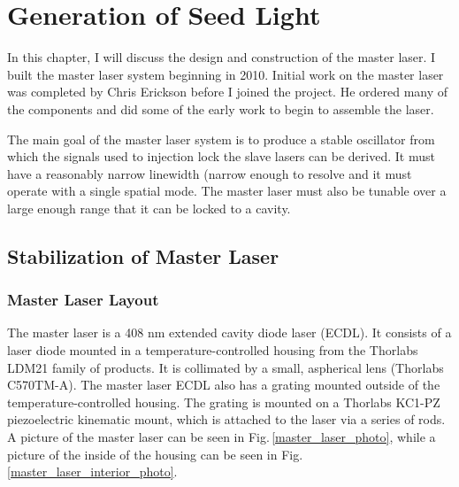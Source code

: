 \chapter{Generation of Seed Light}\label{generationOfSeedLight}

In this chapter, I will discuss the design and construction of the master laser. I built the master laser system beginning in 2010. Initial work on the master laser was completed by Chris Erickson before I joined the project. He ordered many of the components and did some of the early work to begin to assemble the laser.

The main goal of the master laser system is to produce a stable oscillator from which the signals used to injection lock the slave lasers can be derived. It must have a reasonably narrow linewidth (narrow enough to resolve and it must operate with a single spatial mode. The master laser must also be tunable over a large enough range that it can be locked to a cavity.  

\section{Stabilization of Master Laser}
\subsection{Master Laser Layout}
The master laser is a 408 nm extended cavity diode laser (ECDL). It consists of a laser diode mounted in a temperature-controlled housing from the Thorlabs LDM21 family of products. It is collimated by a small, aspherical lens (Thorlabs C570TM-A). The master laser ECDL also has a grating mounted outside of the temperature-controlled housing. The grating is mounted on a Thorlabs KC1-PZ piezoelectric kinematic mount, which is attached to the laser via a series of rods. A picture of the master laser can be seen in Fig.\,\ref{master_laser_photo}, while a picture of the inside of the housing can be seen in Fig.\,\ref{master_laser_interior_photo}.

